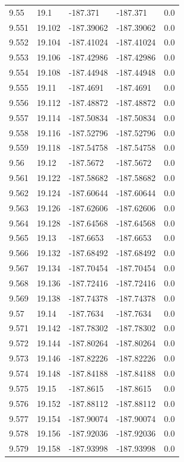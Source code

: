 \begin{tabular}{lllll}
9.55 & 19.1 & -187.371 & -187.371 & 0.0 \\
9.551 & 19.102 & -187.39062 & -187.39062 & 0.0 \\
9.552 & 19.104 & -187.41024 & -187.41024 & 0.0 \\
9.553 & 19.106 & -187.42986 & -187.42986 & 0.0 \\
9.554 & 19.108 & -187.44948 & -187.44948 & 0.0 \\
9.555 & 19.11 & -187.4691 & -187.4691 & 0.0 \\
9.556 & 19.112 & -187.48872 & -187.48872 & 0.0 \\
9.557 & 19.114 & -187.50834 & -187.50834 & 0.0 \\
9.558 & 19.116 & -187.52796 & -187.52796 & 0.0 \\
9.559 & 19.118 & -187.54758 & -187.54758 & 0.0 \\
9.56 & 19.12 & -187.5672 & -187.5672 & 0.0 \\
9.561 & 19.122 & -187.58682 & -187.58682 & 0.0 \\
9.562 & 19.124 & -187.60644 & -187.60644 & 0.0 \\
9.563 & 19.126 & -187.62606 & -187.62606 & 0.0 \\
9.564 & 19.128 & -187.64568 & -187.64568 & 0.0 \\
9.565 & 19.13 & -187.6653 & -187.6653 & 0.0 \\
9.566 & 19.132 & -187.68492 & -187.68492 & 0.0 \\
9.567 & 19.134 & -187.70454 & -187.70454 & 0.0 \\
9.568 & 19.136 & -187.72416 & -187.72416 & 0.0 \\
9.569 & 19.138 & -187.74378 & -187.74378 & 0.0 \\
9.57 & 19.14 & -187.7634 & -187.7634 & 0.0 \\
9.571 & 19.142 & -187.78302 & -187.78302 & 0.0 \\
9.572 & 19.144 & -187.80264 & -187.80264 & 0.0 \\
9.573 & 19.146 & -187.82226 & -187.82226 & 0.0 \\
9.574 & 19.148 & -187.84188 & -187.84188 & 0.0 \\
9.575 & 19.15 & -187.8615 & -187.8615 & 0.0 \\
9.576 & 19.152 & -187.88112 & -187.88112 & 0.0 \\
9.577 & 19.154 & -187.90074 & -187.90074 & 0.0 \\
9.578 & 19.156 & -187.92036 & -187.92036 & 0.0 \\
9.579 & 19.158 & -187.93998 & -187.93998 & 0.0 \\

\end{tabular}
